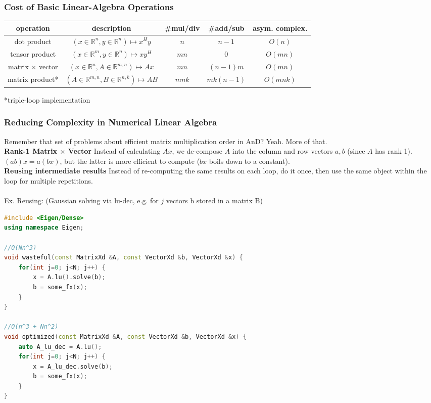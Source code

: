 \documentclass[12pt]{article}
\begin{document}
\subsubsection{Cost of Basic Linear-Algebra Operations}
\begin{tabularx}{\linewidth}{c | c c c c}
operation & description & \#mul/div & \#add/sub & asym. complex.\\ \hline
dot product & $(x \in \mathbb{R}^n, y \in \mathbb{R}^n) \mapsto x^Hy$ & $n$ & $n-1$ & $O(n)$\\
tensor product & $(x \in \mathbb{R}^m, y \in \mathbb{R}^n) \mapsto xy^H$ & $mn$ & $0$ & $O(mn)$\\
matrix $\times$ vector & $(x \in \mathbb{R}^n, A \in \mathbb{R}^{m,n}) \mapsto Ax$ & $mn$ & $(n-1)m$ & $O(mn)$\\
matrix product* & $(A \in \mathbb{R}^{m,n}, B \in \mathbb{R}^{n,k}) \mapsto AB$ & $mnk$ & $mk(n-1)$ & $O(mnk)$
\end{tabularx}
*triple-loop implementation
\subsubsection{Reducing Complexity in Numerical Linear Algebra}
Remember that set of problems about efficient matrix multiplication order in AnD? Yeah. More of that.\\
\textbf{Rank-1 Matrix $\times$ Vector}
Instead of calculating $Ax$, we de-compose $A$ into the column and row vectors $a, b$ (since $A$ has rank 1).\\
$(ab)x = a(bx)$, but the latter is more efficient to compute ($bx$ boils down to a constant).\\
\textbf{Reusing intermediate results}
Instead of re-computing the same results on each loop, do it once, then use the same object within the loop for multiple repetitions.\\\\
Ex. Reusing: (Gaussian solving via lu-dec, e.g. for $j$ vectors b stored in a matrix B)
\begin{lstlisting}[language=c++]
#include <Eigen/Dense>
using namespace Eigen;

//O(Nn^3)
void wasteful(const MatrixXd &A, const VectorXd &b, VectorXd &x) {
	for(int j=0; j<N; j++) {
		x = A.lu().solve(b);
		b = some_fx(x);
	}
}

//O(n^3 + Nn^2)
void optimized(const MatrixXd &A, const VectorXd &b, VectorXd &x) {
	auto A_lu_dec = A.lu();
	for(int j=0; j<N; j++) {
		x = A_lu_dec.solve(b);
		b = some_fx(x);
	}
}
\end{lstlisting}
\end{document}
